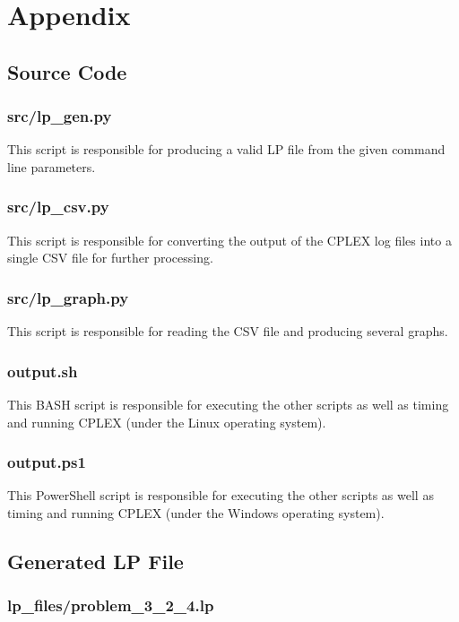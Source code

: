 \documentclass[12pt]{article} %
\begin{document}
\section{Appendix}


\subsection{Source Code}
\label{section:source}

\subsubsection{src/lp\_gen.py}
This script is responsible for producing a valid LP file from the given command line parameters.


\subsubsection{src/lp\_csv.py}
This script is responsible for converting the output of the CPLEX log files into a single CSV file for further processing.


\subsubsection{src/lp\_graph.py}
This script is responsible for reading the CSV file and producing several graphs.


\subsubsection{output.sh}
This BASH script is responsible for executing the other scripts as well as timing and running CPLEX (under the Linux operating system).


\subsubsection{output.ps1}
This PowerShell script is responsible for executing the other scripts as well as timing and running CPLEX (under the Windows operating system).



\subsection{Generated LP File}

\subsubsection{lp\_files/problem\_3\_2\_4.lp}

\end{document}
